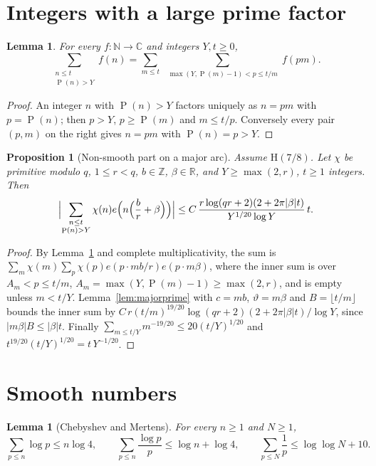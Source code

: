 \documentclass[11pt]{amsart}
\newtheorem{proposition}[theorem]{Proposition}
\newtheorem{lemma}[theorem]{Lemma}
\theoremstyle{definition}
\theoremstyle{remark}
\numberwithin{equation}{section}
\newcommand{\e}{e}
\DeclareMathOperator{\gpf}{P}
\begin{document}
\section{Integers with a large prime factor}\label{sec:nonsmooth}

\begin{lemma}\label{lem:gpfdecomp}
For every $f:\mathbb N\to\mathbb C$ and integers $Y,t\ge0$,
\[
\sum_{\substack{n\le t\\ \gpf(n)>Y}}f(n)=\sum_{m\le t}\ \sum_{\substack{\max(Y,\gpf(m)-1)<p\le t/m}}f(pm).
\]
\end{lemma}

\begin{proof}
An integer $n$ with $\gpf(n)>Y$ factors uniquely as $n=pm$ with $p=\gpf(n)$;
then $p>Y$, $p\ge\gpf(m)$ and $m\le t/p$. Conversely every pair $(p,m)$ on the
right gives $n=pm$ with $\gpf(n)=p>Y$.
\end{proof}

\begin{proposition}[Non-smooth part on a major arc]\label{prop:nsmajor}
Assume $\mathrm H(7/8)$. Let $\chi$ be primitive modulo $q$, $1\le r<q$,
$b\in\mathbb Z$, $\beta\in\mathbb R$, and $Y\ge\max(2,r)$, $t\ge1$ integers. Then
\[
\Bigl|\sum_{\substack{n\le t\\ \gpf(n)>Y}}\chi(n)\e\Bigl(n\Bigl(\frac br+\beta\Bigr)\Bigr)\Bigr|\le
C\,\frac{r\log(qr+2)(2+2\pi|\beta|t)}{Y^{1/20}\log Y}\,t .
\]
\end{proposition}

\begin{proof}
By Lemma~\ref{lem:gpfdecomp} and complete multiplicativity, the sum is
$\sum_m\chi(m)\sum_p\chi(p)\e(p\cdot mb/r)\e(p\cdot m\beta)$, where the inner
sum is over $A_m<p\le t/m$, $A_m=\max(Y,\gpf(m)-1)\ge\max(2,r)$, and is empty
unless $m<t/Y$. Lemma~\ref{lem:majorprime} with $c=mb$, $\vartheta=m\beta$ and
$B=\lfloor t/m\rfloor$ bounds the inner sum by
$C\,r(t/m)^{19/20}\log(qr+2)(2+2\pi|\beta|t)/\log Y$, since $|m\beta|B\le|\beta|t$.
Finally $\sum_{m\le t/Y}m^{-19/20}\le20(t/Y)^{1/20}$ and
$t^{19/20}(t/Y)^{1/20}=t\,Y^{-1/20}$.
\end{proof}

\section{Smooth numbers}\label{sec:smooth}

\begin{lemma}[Chebyshev and Mertens]\label{lem:mertens}
For every $n\ge1$ and $N\ge1$,
\[
\sum_{p\le n}\log p\le n\log4,\qquad\sum_{p\le n}\frac{\log p}p\le\log n+\log4,\qquad\sum_{p\le N}\frac1p\le\log\log N+10 .
\]
\end{lemma}
\end{document}
